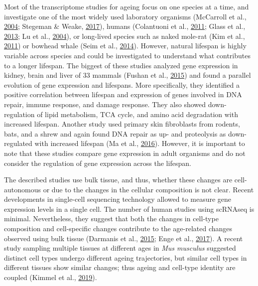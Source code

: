 \documentclass[12pt,twoside]{unicam}
\begin{document}
Most of the transcriptome studies for ageing focus on one species at a time, and investigate one of the most widely used laboratory organisms (McCarroll et al., \protect\hyperlink{ref-McCarroll2004}{2004}; Stegeman \& Weake, \protect\hyperlink{ref-Stegeman2017}{2017}), humans (Colantuoni et al., \protect\hyperlink{ref-Colantuoni2011}{2011}; Glass et al., \protect\hyperlink{ref-Glass2013}{2013}; Lu et al., \protect\hyperlink{ref-Lu2004}{2004}), or long-lived species such as naked mole-rat (Kim et al., \protect\hyperlink{ref-Kim2011}{2011}) or bowhead whale (Seim et al., \protect\hyperlink{ref-Seim2014}{2014}). However, natural lifespan is highly variable across species and could be investigated to understand what contributes to a longer lifespan. The biggest of these studies analyzed gene expression in kidney, brain and liver of 33 mammals (Fushan et al., \protect\hyperlink{ref-Fushan2015}{2015}) and found a parallel evolution of gene expression and lifespans. More specifically, they identified a positive correlation between lifespan and expression of genes involved in DNA repair, immune response, and damage response. They also showed down-regulation of lipid metabolism, TCA cycle, and amino acid degradation with increased lifespan. Another study used primary skin fibroblasts from rodents, bats, and a shrew and again found DNA repair as up- and proteolysis as down-regulated with increased lifespan (Ma et al., \protect\hyperlink{ref-Ma2016}{2016}). However, it is important to note that these studies compare gene expression in adult organisms and do not consider the regulation of gene expression across the lifespan.

The described studies use bulk tissue, and thus, whether these changes are cell-autonomous or due to the changes in the cellular composition is not clear. Recent developments in single-cell sequencing technology allowed to measure gene expression levels in a single cell. The number of human studies using scRNAseq is minimal. Nevertheless, they suggest that both the changes in cell-type composition and cell-specific changes contribute to the age-related changes observed using bulk tissue (Darmanis et al., \protect\hyperlink{ref-Darmanis2015}{2015}; Enge et al., \protect\hyperlink{ref-Enge2017}{2017}). A recent study sampling multiple tissues at different ages in \emph{Mus musculus} suggested distinct cell types undergo different ageing trajectories, but similar cell types in different tissues show similar changes; thus ageing and cell-type identity are coupled (Kimmel et al., \protect\hyperlink{ref-Kimmel2019}{2019}).
\end{document}
